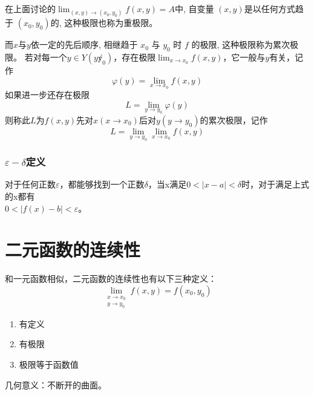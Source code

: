 在上面讨论的$\lim_{(x,y)\to(x_0,y_0)}f(x,y)=A$中, 自变量 $(x, y)$是以任何方式趋于 $(x_0, y_0)$的, 这种极限也称为重极限。

而$x$与$y$依一定的先后顺序, 相继趋于 $x_0$ 与 $y_0$ 时 $f$ 的极限, 这种极限称为累次极限。
若对每一个$y\in Y(y\not y_0)$，存在极限$\lim_{x\to x_0}f(x,y)$，它一般与$y$有关，记作
$$\varphi(y)=\lim_{x\to x_0}f(x,y)$$
如果进一步还存在极限
$$L=\lim_{y\to y_0}\varphi(y)$$
则称此$L$为$f(x,y)$先对$x(x\to x_0)$后对$y(y\to y_0)$的累次极限，记作
$$L=\lim_{y\to y_0}\lim_{x\to x_0}f(x,y)$$

{}

\subsubsection{$\varepsilon-\delta$定义}

对于任何正数$\varepsilon$，都能够找到一个正数$\delta$，当x满足${0<\mid x-a\mid <\delta }$时，对于满足上式的x都有\\ ${0<\mid f(x)-b\mid <\varepsilon }$。

\section{二元函数的连续性}

和一元函数相似，二元函数的连续性也有以下三种定义：
$$\lim_{ \substack{x\to x_0 \\ y\to y_0} }f(x,y)=f(x_0,y_0)$$%
\begin{enumerate}
    \item 有定义
    \item 有极限
    \item 极限等于函数值
\end{enumerate}
几何意义：不断开的曲面。